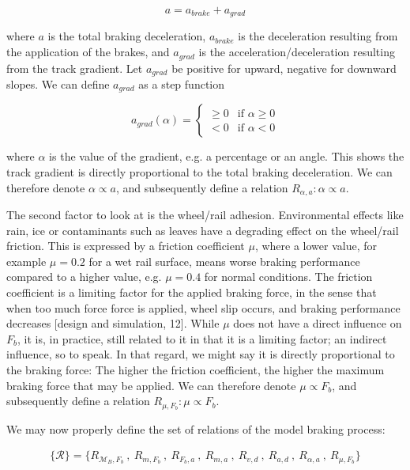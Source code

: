 \begin{equation}
\label{eq:deceleration}
a = a_{brake} + a_{grad}
\end{equation}

\noindent
where $a$ is the total braking deceleration, $a_{brake}$ is the deceleration resulting from the application of the brakes, and $a_{grad}$ is the acceleration/deceleration resulting from the track gradient. Let $a_{grad}$ be positive for upward, negative for downward slopes. We can define $a_{grad}$ as a step function

\begin{equation}
\label{eq:gradientdeceleration}
a_{grad}(\alpha) =
\begin{cases}
\geq 0 & \text{if $\alpha \geq 0$} \\
< 0 & \text{if $\alpha < 0$}
\end{cases}
\end{equation}

\noindent
where $\alpha$ is the value of the gradient, e.g. a percentage or an angle. This shows the track gradient is directly proportional to the total braking deceleration. We can therefore denote $\alpha \propto a$, and subsequently define a relation $R_{\alpha,a}: \alpha \propto a$.
\par
The second factor to look at is the wheel/rail adhesion. Environmental effects like rain, ice or contaminants such as leaves have a degrading effect on the wheel/rail friction. This is expressed by a friction coefficient $\mu$, where a lower value, for example $\mu = 0.2$ for a wet rail surface, means worse braking performance compared to a higher value, e.g. $\mu = 0.4$ for normal conditions. The friction coefficient is a limiting factor for the applied braking force, in the sense that when too much force force is applied, wheel slip occurs, and braking performance decreases [design and simulation, 12]. While $\mu$ does not have a direct influence on $F_{b}$, it is, in practice, still related to it in that it is a limiting factor; an indirect influence, so to speak. In that regard, we might say it is directly proportional to the braking force: The higher the friction coefficient, the higher the maximum braking force that may be applied. We can therefore denote $\mu \propto F_{b}$, and subsequently define a relation $R_{\mu,F_{b}}: \mu \propto F_{b}$.
\bigskip
\par\noindent
We may now properly define the set of relations of the model braking process:

\begin{align*}
\{ {\mathcal{R}} \} = \{ R_{{\mathcal{M}}_{B},F_{b}} \:,\: R_{m,F_{b}} \:,\: R_{F_{b},a} \:,\: R_{m,a} \:,\: R_{v,d} \:,\: R_{a,d} \:,\: R_{\alpha,a} \:,\: R_{\mu,F_{b}} \}
\end{align*}

